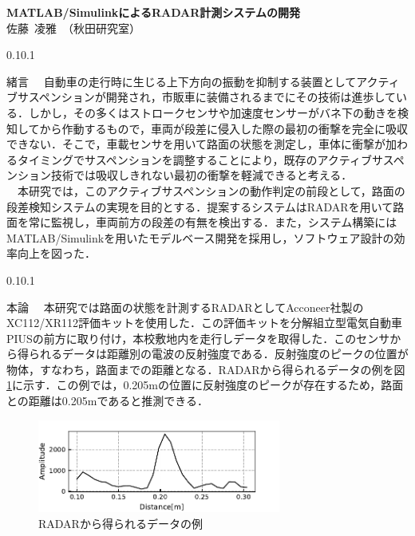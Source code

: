 \documentclass[autodetect-engine, dvipdfmx-if-dvi, ja=standard]{bxjsarticle}
\makeatletter
\renewcommand{\section}{%
    \@startsection{section}{1}{\z@}%
    {0.1\Cvs}{0.1\Cvs}%
    {\normalfont\large\headfont\raggedright}}
\makeatother
\begin{document}
\begin{center}
    \fontsize{14.053pt}{21.079pt}\selectfont
    {\bf MATLAB/SimulinkによるRADAR計測システムの開発}\\

    \fontsize{11.041pt}{16.562pt}\selectfont
    佐藤\ 凌雅\ （秋田研究室）
\end{center}


\begin{multicols}{2}
\fontsize{10.539pt}{15.809pt}\selectfont

\section{緒言}
　自動車の走行時に生じる上下方向の振動を抑制する装置としてアクティブサスペンションが開発され，市販車に装備されるまでにその技術は進歩している．しかし，その多くはストロークセンサや加速度センサーがバネ下の動きを検知してから作動するもので，車両が段差に侵入した際の最初の衝撃を完全に吸収できない．そこで，車載センサを用いて路面の状態を測定し，車体に衝撃が加わるタイミングでサスペンションを調整することにより，既存のアクティブサスペンション技術では吸収しきれない最初の衝撃を軽減できると考える．\\
　本研究では，このアクティブサスペンションの動作判定の前段として，路面の段差検知システムの実現を目的とする．提案するシステムはRADARを用いて路面を常に監視し，車両前方の段差の有無を検出する．また，システム構築にはMATLAB/Simulinkを用いたモデルベース開発を採用し，ソフトウェア設計の効率向上を図った．

\section{本論}
　本研究では路面の状態を計測するRADARとしてAcconeer社製のXC112/XR112評価キットを使用した．この評価キットを分解組立型電気自動車PIUSの前方に取り付け，本校敷地内を走行しデータを取得した．このセンサから得られるデータは距離別の電波の反射強度である．反射強度のピークの位置が物体，すなわち，路面までの距離となる．RADARから得られるデータの例を図\ref{fig:abst_demo}に示す．この例では，0.205mの位置に反射強度のピークが存在するため，路面との距離は0.205mであると推測できる．
\begin{figure}[H]
  \centering
  \includegraphics[width=8cm]{../thesis/fig/abst_demo.pdf}
  \caption{RADARから得られるデータの例}
  \label{fig:abst_demo}
\end{figure}


\end{multicols}
\end{document}

